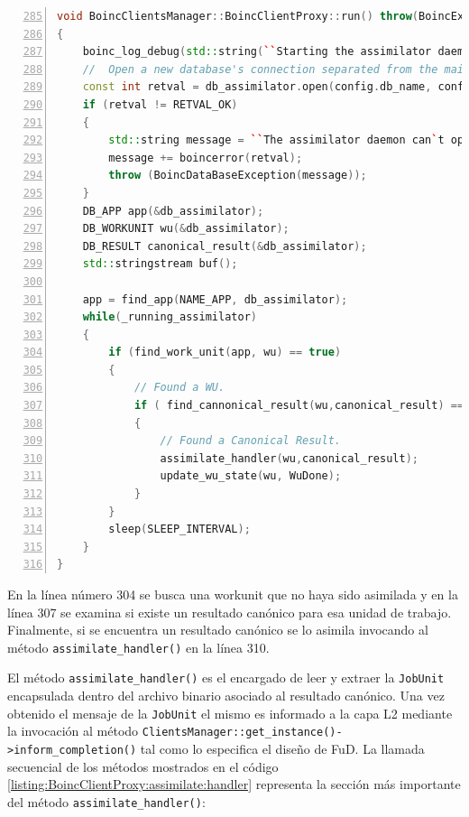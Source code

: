 \begin{lstlisting}[frame=shadowbox, language=C++, numbers=left, xleftmargin=8mm, framexleftmargin=22pt, basicstyle=\scriptsize, numberstyle=\footnotesize, breaklines=true, breakatwhitespace=false, captionpos=b, caption={Método \texttt{run()} de \texttt{BoincClientProxy}}, label=listing:BoincClientProxy:run, backgroundcolor=\color{gris}, firstnumber=285, keywordstyle=\color{Blue}]
void BoincClientsManager::BoincClientProxy::run() throw(BoincException)
{
    boinc_log_debug(std::string(``Starting the assimilator daemon.''));
    //  Open a new database's connection separated from the main process.
    const int retval = db_assimilator.open(config.db_name, config.db_host, config.db_user, config.db_passwd);
    if (retval != RETVAL_OK)
    {
        std::string message = ``The assimilator daemon can`t open DB: '';
        message += boincerror(retval);
        throw (BoincDataBaseException(message));
    }
    DB_APP app(&db_assimilator);
    DB_WORKUNIT wu(&db_assimilator);
    DB_RESULT canonical_result(&db_assimilator);
    std::stringstream buf();

    app = find_app(NAME_APP, db_assimilator);
    while(_running_assimilator)
    {
        if (find_work_unit(app, wu) == true)
        {   
            // Found a WU.
            if ( find_cannonical_result(wu,canonical_result) == true ) 
            {
                // Found a Canonical Result.
                assimilate_handler(wu,canonical_result);
                update_wu_state(wu, WuDone);                
            }
        }
        sleep(SLEEP_INTERVAL);
    }
}
\end{lstlisting}

En la línea número 304 se busca una workunit que no haya sido asimilada y en la línea 307 se examina si existe un resultado canónico para esa unidad de trabajo. Finalmente, si se encuentra un resultado canónico se lo asimila invocando al método \texttt{assimilate\_handler()} en la línea 310.

El método \texttt{assimilate\_handler()} es el encargado de leer y extraer la \texttt{JobUnit} encapsulada dentro del archivo binario asociado al resultado canónico. Una vez obtenido el mensaje de la \texttt{JobUnit} el mismo es informado a la capa L2 mediante la invocación al método \texttt{ClientsManager::get\_instance()->inform\_completion()} tal como lo especifica el diseño de FuD. La llamada secuencial de los métodos mostrados en el código \ref{listing:BoincClientProxy:assimilate:handler} representa la sección más importante del método \texttt{assimilate\_handler()}:

